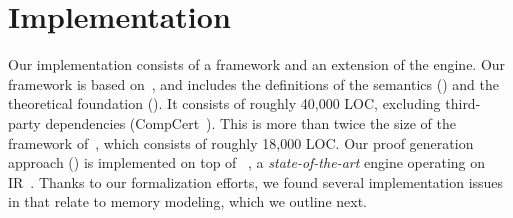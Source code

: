 \section{Implementation}
\label{sec:implementation}


Our implementation consists of a \coq framework and an extension of the \SE engine.
Our \coq framework is based on~\cite{klee-rocq},
and includes the definitions of the semantics () and the theoretical foundation ().
It consists of roughly 40,000 LOC,
excluding third-party dependencies (\eg CompCert~\cite{CompCert}).
This is more than twice the size of the framework of~\cite{klee-rocq}, which consists of roughly 18,000 LOC.
Our proof generation approach () is implemented on top of \klee~\cite{klee},
a \emph{state-of-the-art} \SE engine operating on \llvm IR~\cite{llvm}.
Thanks to our formalization efforts,
we found several implementation issues in \klee that relate to memory modeling, which we outline next.

